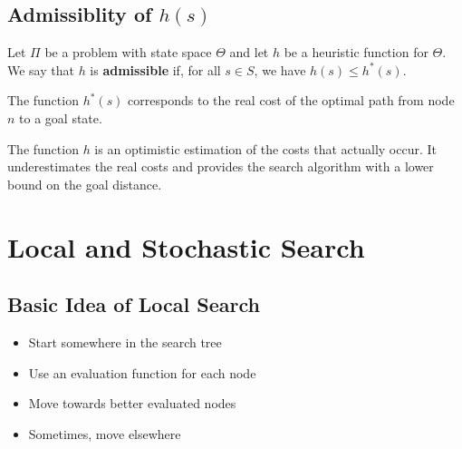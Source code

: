\documentclass[conference, a4paper]{styles/acmsiggraph}
\begin{document}
        
    \subsection{Admissiblity of $h(s)$}
        Let $\Pi$ be a problem with state space $\Theta$ and let $h$ be a heuristic function for $\Theta$.
        We say that $h$ is \textbf{admissible} if, for all $s \in S$, we have $h(s) \leq h^*(s)$.\newline
        
        The function $h^*(s)$ corresponds to the real cost of the optimal path from node $n$ to a goal state.\newline
        
        The function $h$ is an optimistic estimation of the costs that actually occur.
        It underestimates the real costs and provides the search algorithm with a lower bound on the goal distance.
        
        
        
        
        
        
        
        
\section{Local and Stochastic Search}
    
    \subsection{Basic Idea of Local Search}
        \begin{itemize}
            \item Start somewhere in the search tree
            \item Use an evaluation function for each node
            \item Move towards better evaluated nodes
            \item Sometimes, move elsewhere
        \end{itemize}
    
    
\end{document}
